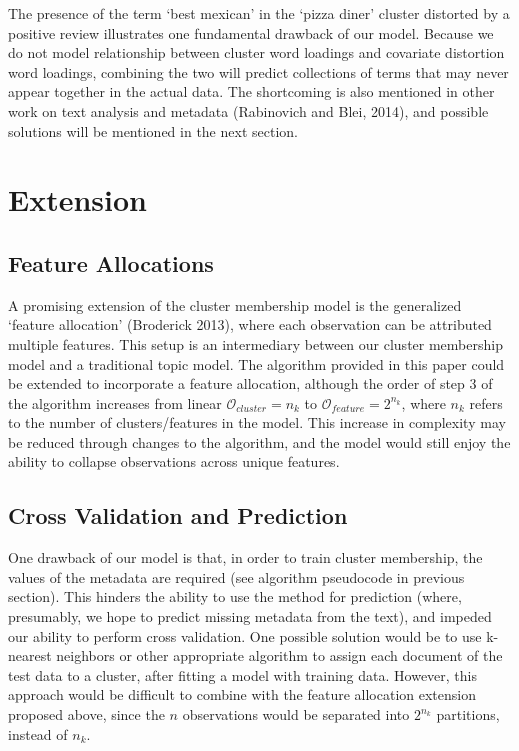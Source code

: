 \documentclass[12pt]{article}
\begin{document}
The presence of the term `best mexican' in the `pizza diner' cluster distorted by a positive review illustrates one fundamental drawback of our model. Because we do not model relationship between cluster word loadings and covariate distortion word loadings, combining the two will predict collections of terms that may never appear together in the actual data. The shortcoming is also mentioned in other work on text analysis and metadata (Rabinovich and Blei, 2014), and possible solutions will be mentioned in the next section.


\section{Extension}\label{extensions}

\subsection{Feature Allocations}
A promising extension of the cluster membership model is the generalized `feature allocation' (Broderick 2013), where each observation can be attributed multiple features. This setup is an intermediary between our cluster membership model and a traditional topic model. 
The algorithm provided in this paper could be extended to incorporate a feature allocation, although the order of step 3 of the algorithm increases from linear $\mathcal{O}_{cluster} = n_k$ to $\mathcal{O}_{feature} = 2^{n_k}$, where $n_k$ refers to the number of clusters/features in the model. This increase in complexity may be reduced through changes to the algorithm, and the model would still enjoy the ability to collapse observations across unique features. 

\subsection{Cross Validation and Prediction}
One drawback of our model is that, in order to train cluster membership, the values of the metadata are required (see algorithm pseudocode in previous section). This hinders the ability to use the method for prediction (where, presumably, we hope to predict missing metadata from the text), and impeded our ability to perform cross validation. One possible solution would be to use k-nearest neighbors or other appropriate algorithm to assign each document of the test data to a cluster, after fitting a model with training data. However, this approach would be difficult to combine with the feature allocation extension proposed above, since the $n$ observations would be separated into $2^{n_k}$ partitions, instead of $n_k$. 
\end{document}
